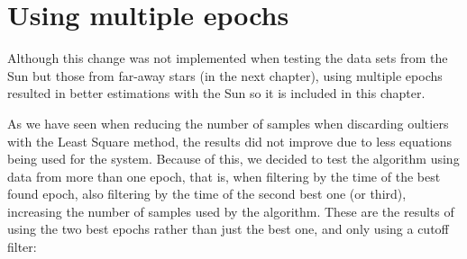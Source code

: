 \clearpage

\section{Using multiple epochs}

Although this change was not implemented when testing the data sets from the Sun but those from far-away stars (in the next chapter), using multiple epochs resulted in better estimations with the Sun so it is included in this chapter.

As we have seen when reducing the number of samples when discarding oultiers with the Least Square method, the results did not improve due to less equations being used for the system. Because of this, we decided to test the algorithm using data from more than one epoch, that is, when filtering by the time of the best found epoch, also filtering by the time of the second best one (or third), increasing the number of samples used by the algorithm. These are the results of using the two best epochs rather than just the best one, and only using a cutoff filter:

